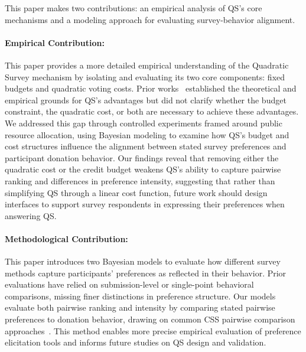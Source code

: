 
This paper makes two contributions: an empirical analysis of QS's core mechanisms and a modeling approach for evaluating survey-behavior alignment.

\paragraph{Empirical Contribution: } 
This paper provides a more detailed empirical understanding of the Quadratic Survey mechanism by isolating and evaluating its two core components: fixed budgets and quadratic voting costs. Prior works~\cite{georgescuFixedbudgetMultipleissueQuadratic2024, eguia2019quadratic, quarfoot2017quadratic, chengCanShowWhat2021} established the theoretical and empirical grounds for QS's advantages but did not clarify whether the budget constraint, the quadratic cost, or both are necessary to achieve these advantages. We addressed this gap through controlled experiments framed around public resource allocation, using Bayesian modeling to examine how QS's budget and cost structures influence the alignment between stated survey preferences and participant donation behavior. Our findings reveal that removing either the quadratic cost or the credit budget weakens QS's ability to capture pairwise ranking and differences in preference intensity, suggesting that rather than simplifying QS through a linear cost function, future work should design interfaces to support survey respondents in expressing their preferences when answering QS.

\paragraph{Methodological Contribution:}
This paper introduces two Bayesian models to evaluate how different survey methods capture participants' preferences as reflected in their behavior. Prior evaluations have relied on submission-level or single-point behavioral comparisons, missing finer distinctions in preference structure. Our models evaluate both pairwise ranking and intensity by comparing stated pairwise preferences to donation behavior, drawing on common CSS pairwise comparison approaches~\cite{collewet2023preference, hauserIntensityMeasuresConsumer1980a}. This method enables more precise empirical evaluation of preference elicitation tools and informs future studies on QS design and validation.


